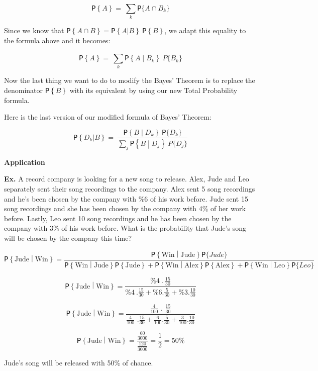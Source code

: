 \documentclass[
]{article}
\begin{document}
\[ꓑ\left\{ A \right\} = \ \sum_{k}^{}{ꓑ\{ A \cap B_{k}\}}\]

Since we know that
\(ꓑ\left\{ A \cap B \right\} = ꓑ\left\{ A|B \right\}\ ꓑ\left\{ B \right\}\),
we adapt this equality to the formula above and it becomes:

\[ꓑ\left\{ A \right\} = \ \sum_{k}^{}{ꓑ\left\{ A \middle| B_{k} \right\}\ P\{ B_{k}\}}\]

Now the last thing we want to do to modify the Bayes' Theorem is to
replace the denominator \(ꓑ\left\{ B \right\}\) with its equivalent by
using our new Total Probability formula.

Here is the last version of our modified formula of Bayes' Theorem:

\[ꓑ\left\{ D_{k}|B \right\} = \ \frac{ꓑ\left\{ B \middle| D_{k} \right\}\ ꓑ\{ D_{k}\}}{\sum_{j}^{}{ꓑ\left\{ B \middle| D_{j} \right\}\ P\{ D_{j}\}}}\]

\textbf{Application}

\textbf{Ex.} A record company is looking for a new song to release.
Alex, Jude and Leo separately sent their song recordings to the company.
Alex sent 5 song recordings and he's been chosen by the company with \%6
of his work before. Jude sent 15 song recordings and she has been chosen
by the company with 4\% of her work before. Lastly, Leo sent 10 song
recordings and he has been chosen by the company with 3\% of his work
before. What is the probability that Jude's song will be chosen by the
company this time?

\[ꓑ\left\{ \text{Jude} \middle| \text{Win} \right\} = \frac{ꓑ\left\{ \text{Win} \middle| \text{Jude} \right\} ꓑ\{ Jude\}}{ꓑ\left\{ \text{Win} \middle| \text{Jude} \right\} ꓑ\left\{ \text{Jude} \right\} + ꓑ\left\{ \text{Win} \middle| \text{Alex} \right\} ꓑ\left\{ \text{Alex} \right\} + ꓑ\left\{ \text{Win} \middle| \text{Leo} \right\} ꓑ\{ Leo\}}\]

\[ꓑ\left\{ \text{Jude} \middle| \text{Win} \right\} = \frac{\% 4\ .\ \frac{15}{30}}{\% 4\ .\frac{15}{30} + \% 6.\frac{5}{30} + \% 3.\frac{10}{30}}\]

\[ꓑ\left\{ \text{Jude} \middle| \text{Win} \right\} = \frac{\frac{4}{100}\text{\ .\ }\frac{15}{30}}{\frac{4}{100}\text{\ .}\frac{15}{30} + \frac{6}{100}.\frac{5}{30} + \frac{3}{100}.\frac{10}{30}}\]

\[ꓑ\left\{ \text{Jude} \middle| \text{Win} \right\} = \frac{\frac{60}{3000}}{\frac{120}{3000}} = \frac{1}{2} = 50\%\]

Jude's song will be released with 50\% of chance.
\end{document}
